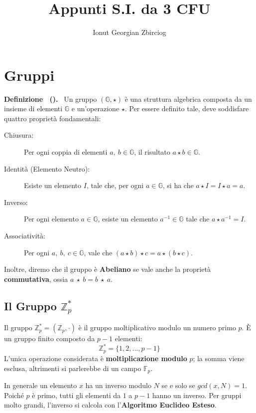 \documentclass[a4paper, 11pt]{article}
\title{Appunti S.I. da 3 CFU}
\author{Ionut Georgian Zbirciog}
\newenvironment{definition}[1][]{
  \par\noindent\textbf{Definizione%
  \if\relax\detokenize{#1}\relax\else\ (\textbf{#1})\fi.}\ }{}
\begin{document}
\maketitle

\tableofcontents
\newpage

\section{Gruppi}

\begin{definition}
    Un gruppo $(\mathbb{G}, \star)$ è una struttura algebrica composta da un insieme di elementi $\mathbb{G}$ e un'operazione $\star$. Per essere definito tale, deve soddisfare quattro proprietà fondamentali:
    \begin{description}
        \item[Chiusura:] Per ogni coppia di elementi $a,\ b \in \mathbb{G}$, il risultato $a \star b \in \mathbb{G}$.
        \item[Identità (Elemento Neutro):] Esiste un elemento $I$, tale che, per ogni $a \in \mathbb{G}$, si ha che $a \star I = I \star a = a$.
        \item[Inverso:] Per ogni elemento $a \in \mathbb{G}$, esiste un elemento $a^{-1} \in \mathbb{G}$ tale che $a \star a^{-1} = I$.
        \item[Associatività:] Per ogni $a,\ b,\ c \in \mathbb{G}$, vale che $(a \star b) \star c = a \star (b \star c)$.  
    \end{description}
\end{definition}

Inoltre, diremo che il gruppo è \textbf{Abeliano} se vale anche la proprietà \textbf{commutativa}, ossia $a\ \star\ b = b\ \star\ a$.

\subsection{Il Gruppo $\mathbb{Z}_p^*$}

Il gruppo $\mathbb{Z}_p^* = (\mathbb{Z}_p, \cdot)$ è il gruppo moltiplicativo modulo un numero primo $p$. È un gruppo finito composto da $p-1$ elementi:
\[
    \mathbb{Z}_p^* = \{1, 2, \dots, p - 1\}
\]
L'unica operazione considerata è \textbf{moltiplicazione modulo} $p$; la somma viene esclusa, altrimenti si parlerebbe di un campo $\mathbb{F}_p$.
 
In generale un elemento $x$ ha un inverso modulo $N$ se e solo se $gcd(x, N) = 1$. Poiché $p$ è primo, tutti gli elementi da $1$ a $p - 1$ hanno un inverso. Per gruppi molto grandi, l'inverso si calcola con l'\textbf{Algoritmo Euclideo Esteso}.
\end{document}
